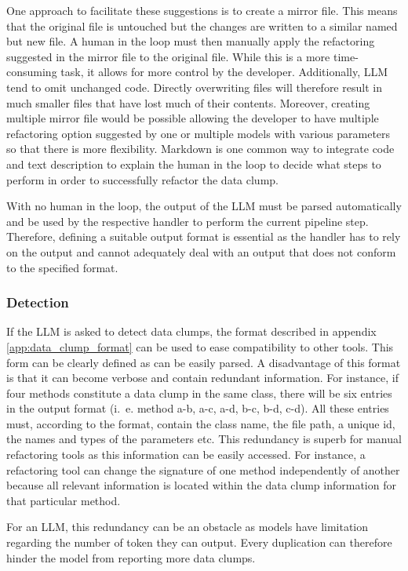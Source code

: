 One approach to facilitate these suggestions is to create a mirror file. This means that the original file is untouched but the changes are written to a similar named but new file. A human in the loop must then manually apply the refactoring suggested in the mirror file to the original file. While this is a more time-consuming task, it allows for more control by the developer. Additionally, \acs{LLM} tend to omit unchanged code. Directly overwriting files will therefore result in much smaller files that have lost much of their contents. Moreover, creating multiple mirror file would be possible allowing the developer to have multiple refactoring option suggested by one or multiple models with various parameters so that there is more flexibility. 
Markdown is one common way to integrate code and text description to explain the human in the loop to decide what steps to perform in order to successfully refactor the data clump.  

\bigskip

With no human in the loop, the output of the \ac{LLM} must be parsed automatically and be used by the respective handler to perform the current pipeline step. Therefore, defining a suitable output  format  is essential as the handler has to rely on the output and cannot adequately deal with an output that does not conform to the specified format. 
\subsubsection{Detection}
If the \ac{LLM} is asked to detect data clumps, the format described in appendix \ref{app:data_clump_format} can be used to ease compatibility to other tools. This form can be clearly defined as can be easily parsed. A disadvantage of this format is that it can become verbose and contain redundant information. For instance, if four methods  constitute a data clump in the same class, there will be six entries in the output format (i.~e. method a-b, a-c, a-d, b-c, b-d, c-d). All these entries must, according to the format, contain the class name, the file path, a unique id, the names and types of the parameters etc. This redundancy is superb for manual refactoring tools as this information can be easily accessed. For instance, a refactoring tool can change the signature of one method independently of another because all relevant information is located within the data clump information for that particular method. 

For an \ac{LLM}, this redundancy can be an obstacle as models have limitation regarding the number of token they can output. Every duplication can therefore hinder the model from reporting more data clumps.



